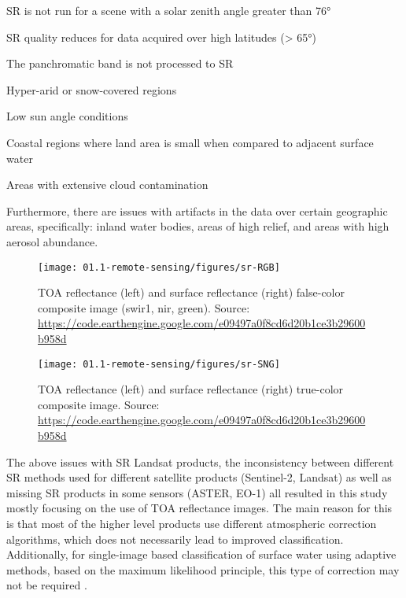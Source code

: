 \begin{enumerate*}[label=(\emph{\alph*})]
	\item SR is not run for a scene with a solar zenith angle greater than 76°
	\item SR quality reduces for data acquired over high latitudes (> 65°)
	\item The panchromatic band is not processed to SR
	\item Hyper-arid or snow-covered regions
	\item Low sun angle conditions
	\item Coastal regions where land area is small when compared to adjacent surface water
	\item Areas with extensive cloud contamination
\end{enumerate*}

Furthermore, there are issues with artifacts in the data over certain geographic areas, specifically: inland water bodies, areas of high relief, and areas with high aerosol abundance. 

\begin{figure}
	\texttt{[image: 01.1-remote-sensing/figures/sr-RGB]}
	\caption{TOA reflectance (left) and surface reflectance (right) false-color composite image (swir1, nir, green). Source: \url{https://code.earthengine.google.com/e09497a0f8cd6d20b1ce3b29600b958d}}
	\label{fig:example-sr-rgb}
\end{figure}

\begin{figure}
	\texttt{[image: 01.1-remote-sensing/figures/sr-SNG]}
	\caption{TOA reflectance (left) and surface reflectance (right) true-color composite image. Source: \url{https://code.earthengine.google.com/e09497a0f8cd6d20b1ce3b29600b958d}}
	\label{fig:example-sr-sng}
\end{figure}

The above issues with SR Landsat products, the inconsistency between different SR methods used for different satellite products (Sentinel-2, Landsat) as well as missing SR products in some sensors (ASTER, EO-1) all resulted in this study mostly focusing on the use of TOA reflectance images. The main reason for this is that most of the higher level products use different atmospheric correction algorithms, which does not necessarily lead to improved classification. Additionally, for single-image based classification of surface water using adaptive methods, based on the maximum likelihood principle, this type of correction may not be required \citep{song2001classification}.

